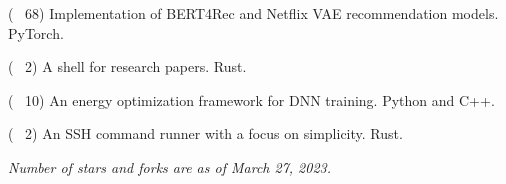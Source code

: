 
\begin{cvlist}

  \cvlistitem
  {\href{https://github.com/jaywonchung/BERT4Rec-VAE-Pytorch}{} {\normalfont ( \faCodeFork~68)}} %
    {Implementation of BERT4Rec and Netflix VAE recommendation models. PyTorch.} %

  \cvlistitem
    {\href{https://github.com/jaywonchung/reason}{} {\normalfont ( \faCodeFork~2)}} %
    {A shell for research papers. Rust.} %

  \cvlistitem
    {\href{https://github.com/SymbioticLab/Zeus}{} {\normalfont ( \faCodeFork~10)}} %
    {An energy optimization framework for DNN training. Python and C++.} %

  \cvlistitem
    {\href{https://github.com/jaywonchung/pegasus}{} {\normalfont ( \faCodeFork~2)}} %
    {An SSH command runner with a focus on simplicity. Rust.} %

\end{cvlist}

\vspace{-5mm}

\begin{cvparagraph}
\textit{Number of stars and forks are as of March 27, 2023.}
\end{cvparagraph}

